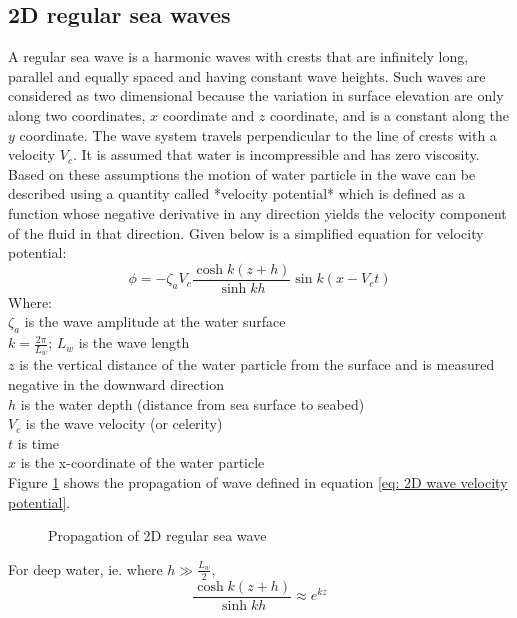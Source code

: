 \subsection{2D regular sea waves}

A regular sea wave is a harmonic waves with crests that are infinitely long, 
parallel and equally spaced and having constant wave heights. Such waves are
considered as two dimensional because the variation in surface elevation are
only along two coordinates, $x$ coordinate and $z$ coordinate, and is a constant
along the $y$ coordinate. The wave system travels perpendicular to the line of
crests with a velocity $V_c$. It is assumed that water is
incompressible and has zero viscosity. Based on these assumptions the motion of 
water particle in the wave can be described using a quantity called *velocity
potential* which is defined as a function whose negative derivative in any
direction yields the velocity component of the fluid in that direction. Given
below is a simplified equation for velocity potential:
\begin{equation}
  \phi = - \zeta_a V_c \frac{\cosh k(z+h)}{\sinh kh} \sin k(x - V_c t)
  \label {eq: 2D wave velocity potential}
\end{equation}
Where: \\ 
$\zeta_a$ is the wave amplitude at the water surface\\ 
$k = \frac{2 \pi}{L_w}$; $L_w$ is the wave length\\ 
$z$ is the vertical distance of the water particle from the surface and is 
measured negative in the downward direction\\ 
$h$ is the water depth (distance from sea surface to seabed)\\ 
$V_c$ is the wave velocity (or celerity)\\ 
$t$ is time\\ 
$x$ is the x-coordinate of the water particle\\
Figure \ref{fig: RegularWave-1} shows the propagation of wave defined in 
equation \ref{eq: 2D wave velocity potential}.
\begin{figure} 
  \caption{Propagation of 2D regular sea wave} 
  \label{fig: RegularWave-1} 
\end{figure}

For deep water, ie. where $h \gg \frac{L_w}{2}$, 
\begin{equation}
  \frac{\cosh k(z + h)}{\sinh kh} \approx e^{kz}
  \label{eq: ratio approx for deep water}
\end{equation}

